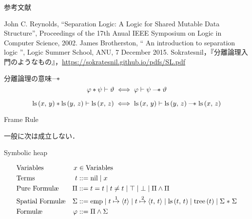 \documentclass[notheorems, aspectratio=169, 12pt, unicode]{beamer}
\begin{document}
\begin{frame}{参考文献}
 \begin{thebibliography}{9}
   John C. Reynolds, ``Separation Logic: A Logic for Shared Mutable Data Structure'', Proceedings of the 17th Anual IEEE Symposium on Logic in Computer Science, 2002.
   James Brotherston, 
	  `` An introduction to separation logic '', 
	  Logic Summer School, ANU, 7 December 2015.
 Sokratesnil，『分離論理入門のようなもの』，\url{https://sokratesnil.github.io/pdfs/SL.pdf}
 \end{thebibliography} 
\end{frame}

\appendix

 \begin{frame}{分離論理の意味}{$\mathmagicwand$}
  \[
  \varphi * \psi \vdash \vartheta \iff \varphi \vdash \psi \mathmagicwand \vartheta
  \]
  
 \begin{ex}
  \[
  \mathprls{x}{y} * \mathprls{y}{z} \vdash \mathprls{x}{z} \iff \mathprls{x}{y} \vdash \mathprls{y}{z} \mathmagicwand \mathprls{x}{z}
  \]
 \end{ex}
 \end{frame}
 
 \begin{frame}{Frame Rule}
  \begin{definition}
   \begin{prooftree}
   \end{prooftree}
  \end{definition}
  \begin{rem}
   一般に次は成立しない．
   \begin{prooftree}
   \end{prooftree}
  \end{rem}
 \end{frame}

 \begin{frame}{Symbolic heap}
  \begin{definition}
  \minusbaselineskip
  \begin{align*}
   &\text{Variables}  &x &\in \mathVar \\
   &\text{Terms}  &t &::= \mathvalnil \mathrelbar x \\
   &\text{Pure Formul\ae}  &\Pi &::=   t = t  \mathrelbar t \neq t \mathrelbar \top \mathrelbar \bot \mathrelbar \Pi \land \Pi \\
   &\text{Spatial Formul\ae}  &\Sigma &::= \mathemp \mathrelbar \mathpointer{t}{1}{t} \mathrelbar  \mathpointer{t}{2}{t{,}\ t} \mathrelbar  \mathprls{t}{t} \mathrelbar \mathprtree{t} \mathrelbar \Sigma \mathsepstar \Sigma \\
   &\text{Formul\ae}  &\varphi &::=  \Pi \land \Sigma
  \end{align*}
 \end{definition}
 \end{frame}
\end{document}

